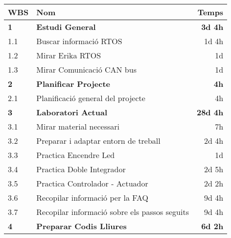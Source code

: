 \begin{center}
	\begin{longtable}{ l | p{10cm} | r }
		
\textbf{WBS} & \textbf{Nom} & \textbf{Temps}\\
\hline \hline
	\textbf{1} & 		\textbf{Estudi General } & 	\textbf{3d 4h}\\
\hline
1.1 & Buscar informació RTOS & 1d 4h\\
\hline
1.2 & Mirar Erika RTOS & 1d\\
\hline
1.3 & Mirar Comunicació CAN bus & 1d\\
\hline \hline
	\textbf{2} & 	\textbf{Planificar Projecte } & 	\textbf{4h}\\
\hline
2.1 & Planificació general del projecte & 4h\\
\hline \hline
	\textbf{3} & 	\textbf{Laboratori Actual } & 	\textbf{28d 4h}\\
\hline
3.1 & Mirar material necessari & 7h\\
\hline
3.2 & Preparar i adaptar entorn de treball & 2d 4h\\
\hline
3.3 & Practica Encendre Led & 1d\\
\hline
3.4 & Practica Doble Integrador & 2d 5h\\
\hline
3.5 & Practica Controlador - Actuador & 2d 2h\\
\hline
3.6 & Recopilar informació per la FAQ & 9d 4h\\
\hline
3.7 & Recopilar informació sobre els passos seguits & 9d 4h\\
\hline \hline
	\textbf{4} & 	\textbf{ Preparar Codis Lliures } & 	\textbf{6d 2h}\\

\end{longtable}
\end{center}
